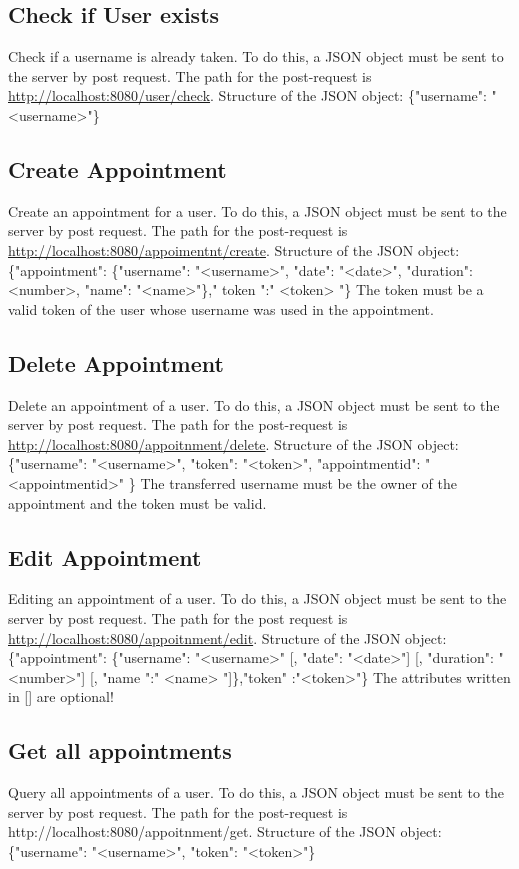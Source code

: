 \documentclass[12pt]{scrartcl}
\begin{document}
    \subsection{Check if User exists}
        Check if a username is already taken.
        To do this, a JSON object must be sent to the server by post request. The path for the post-request is
        \url{http://localhost:8080/user/check}.
        Structure of the JSON object: \{"username": "<username>"\}

    \subsection{Create Appointment}
        Create an appointment for a user.
        To do this, a JSON object must be sent to the server by post request. The path for the post-request is
        \url{http://localhost:8080/appoimentnt/create}.
        Structure of the JSON object: \{"appointment": \{"username": "<username>", "date": "<date>", "duration": <number>, "name": "<name>"\}," token ":" <token> "\}
        The token must be a valid token of the user whose username was used in the appointment.

    \subsection{Delete Appointment}
        Delete an appointment of a user.
        To do this, a JSON object must be sent to the server by post request. The path for the post-request is
        \url{http://localhost:8080/appoitnment/delete}.
        Structure of the JSON object: \{"username": "<username>", "token": "<token>", "appointmentid": "<appointmentid>" \}
        The transferred username must be the owner of the appointment and the token must be valid.

    \subsection{Edit Appointment}
        Editing an appointment of a user.
        To do this, a JSON object must be sent to the server by post request. The path for the post request is \url{http://localhost:8080/appoitnment/edit}.
        Structure of the JSON object: \{"appointment": \{"username": "<username>" [, "date": "<date>"] [, "duration": "<number>"] [, "name ":" <name> "]\},"token" :"<token>"\}
        The attributes written in {[]} are optional!
    

    \subsection{Get all appointments}
        Query all appointments of a user.
        To do this, a JSON object must be sent to the server by post request. The path for the post-request is
        http://localhost:8080/appoitnment/get.
        Structure of the JSON object: \{"username": "<username>", "token": "<token>"\}
\end{document}
